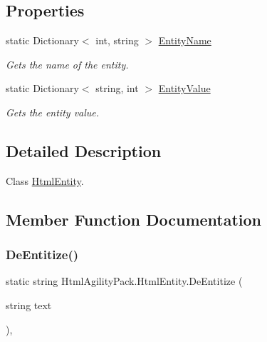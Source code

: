 \subsection*{Properties}
\begin{DoxyCompactItemize}
\item 
static Dictionary$<$ int, string $>$ \hyperlink{class_html_agility_pack_1_1_html_entity_a3b277cbbff3e632112d644da68b1d0a0}{Entity\+Name}
\begin{DoxyCompactList}\small\item\em Gets the name of the entity. \end{DoxyCompactList}\item 
static Dictionary$<$ string, int $>$ \hyperlink{class_html_agility_pack_1_1_html_entity_af2b170765d77b4c01818806bda5acbf8}{Entity\+Value}
\begin{DoxyCompactList}\small\item\em Gets the entity value. \end{DoxyCompactList}\end{DoxyCompactItemize}


\subsection{Detailed Description}
Class \hyperlink{class_html_agility_pack_1_1_html_entity}{Html\+Entity}. 



\subsection{Member Function Documentation}
\mbox{\label{class_html_agility_pack_1_1_html_entity_a0eff30150e69a7c8097125ee108a0a49}} 
\subsubsection{\texorpdfstring{De\+Entitize()}{DeEntitize()}}
{\footnotesize\ttfamily static string Html\+Agility\+Pack.\+Html\+Entity.\+De\+Entitize (\begin{DoxyParamCaption}\item[{string}]{text }\end{DoxyParamCaption})\hspace{0.3cm}{\ttfamily [inline]}, {\ttfamily [static]}}




